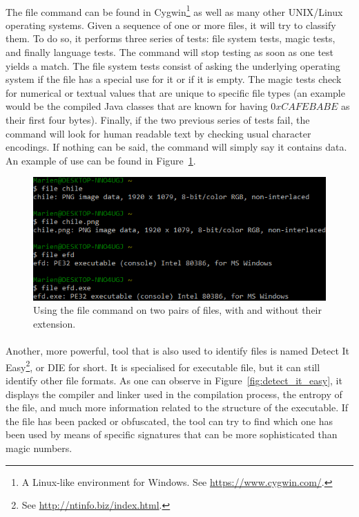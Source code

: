 \paragraph{}
The file command can be found in Cygwin\footnote{A Linux-like environment for Windows. See \url{https://www.cygwin.com/}.} as well as many other UNIX/Linux operating systems. Given a sequence of one or more files, it will try to classify them. To do so, it performs three series of tests: file system tests, magic tests, and finally language tests. The command will stop testing as soon as one test yields a match. The file system tests consist of asking the underlying operating system if the file has a special use for it or if it is empty. The magic tests check for numerical or textual values that are unique to specific file types (an example would be the compiled Java classes that are known for having $0xCAFEBABE$ as their first four bytes). Finally, if the two previous series of tests fail, the command will look for human readable text by checking usual character encodings. If nothing can be said, the command will simply say it contains data. An example of use can be found in Figure~\ref{fig:file_command}.

\begin{figure}[!htb]
	\centering
	\includegraphics[width=1\textwidth]{reverse_engineering/file_command.png}
	\caption{Using the file command on two pairs of files, with and without their extension.}
	\label{fig:file_command}
\end{figure}

\paragraph{}
Another, more powerful, tool that is also used to identify files is named Detect It Easy\footnote{See \url{http://ntinfo.biz/index.html}.}, or DIE for short. It is specialised for executable file, but it can still identify other file formats. As one can observe in Figure~\ref{fig:detect_it_easy}, it displays the compiler and linker used in the compilation process, the entropy of the file, and much more information related to the structure of the executable. If the file has been packed or obfuscated, the tool can try to find which one has been used by means of specific signatures that can be more sophisticated than magic numbers.

